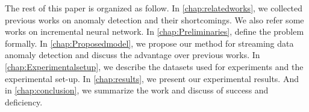 The rest of this paper is organized as follow. In \autoref{chap:relatedworks}, we collected previous works on anomaly detection and their shortcomings. We also refer some works on incremental neural network. In \autoref{chap:Preliminaries}, define the problem formally. In \autoref{chap:Proposedmodel}, we propose our method for streaming data anomaly detection and discuss the advantage over previous works. In \autoref{chap:Experimentalsetup}, we describe the datasets used for experiments and the experimental set-up. In \autoref{chap:results}, we present our experimental results. And in \autoref{chap:conclusion}, we summarize the work and discuss of success and deficiency.
